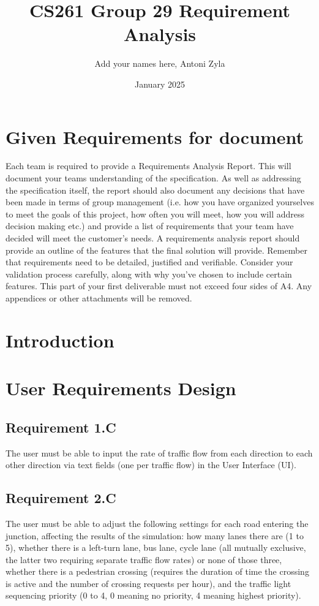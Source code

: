 \documentclass{article}
\title{CS261 Group 29 Requirement Analysis}
\author{Add your names here, Antoni Zyla}
\date{January 2025}
\begin{document}
\maketitle

\section{Given Requirements for document}
Each team is required to provide a Requirements Analysis Report. This will 
document your teams understanding of the specification. As well as addressing 
the specification itself, the report should also document any decisions that 
have been made in terms of group management (i.e. how you have organized 
yourselves to meet the goals of this project, how often you will meet, how you 
will address decision making etc.) and provide a list of requirements that 
your team have decided will meet the customer's needs.
A requirements analysis report should provide an outline of the features that 
the final solution will provide. Remember that requirements need to be detailed, 
justified and verifiable. Consider your validation process carefully, along 
with why you've chosen to include certain features. This part of your first 
deliverable must not exceed four sides of A4. Any appendices or other attachments 
will be removed.

\section{Introduction}

\section{User Requirements Design} \label{requirements_user}
\subsection{Requirement 1.C}
The user must be able to input the rate of traffic flow from 
each direction to each other direction via text fields (one per traffic flow) 
in the User Interface (UI).
\subsection{Requirement 2.C}
The user must be able to adjust the following settings for each 
road entering the junction, affecting the results of the simulation: how many 
lanes there are (1 to 5), whether there is a left-turn lane, bus lane, cycle 
lane (all mutually exclusive, the latter two requiring separate traffic flow rates) 
or none of those three, whether there is a pedestrian crossing (requires the duration 
of time the crossing is active and the number of crossing requests per hour), 
and the traffic light sequencing priority (0 to 4, 0 meaning no priority, 4 
meaning highest priority).
\end{document}

